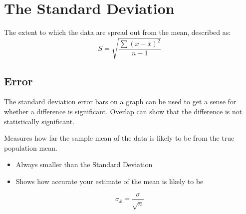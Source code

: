 \chapter{The Standard Deviation}
\begin{definition}\label{def:standard_deviation}
    The extent to which the data are spread out from the mean, described as:
    \[
        S=\sqrt{\frac{\sum(x-\bar{x})^2}{n-1}}
    \]
\end{definition}
\section{Error}
The standard deviation error bars on a graph can be used to get a sense for whether a difference is significant. Overlap can show that the difference is not statistically significant.
\begin{definition}\label{def:standard_error}
    Measures how far the sample mean of the data is likely to be from the true population mean.
    \begin{itemize}
        \item Always smaller than the Standard Deviation
        \item Shows how accurate your estimate of the mean is likely to be
    \end{itemize}
    \[
        \sigma_{\bar{x}}=\frac{\sigma}{\sqrt{n}}
    \]
\end{definition}
